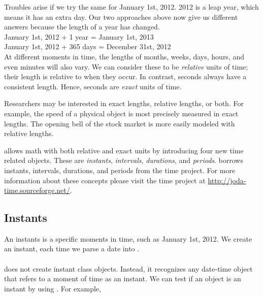 \documentclass[article]{jss}
\begin{document}
Troubles arise if we try the same for January 1st, 2012. 2012 is a leap year, which means it has an extra day. Our two approaches above now give us different answers because the length of a year has changed.\\ 

January 1st, 2012 + 1 year = January 1st, 2013\\
January 1st, 2012 + 365 days = December 31st,  2012\\

At different moments in time, the lengths of months, weeks, days, hours, and even minutes will also vary. We can consider these to be \emph{relative} units of time; their length is relative to when they occur. In contrast, seconds always have a consistent length. Hence, seconds are \emph{exact} units of time.

Researchers may be interested in exact lengths, relative lengths, or both. For example, the speed of a physical object is most precisely measured in exact lengths. The opening bell of the stock market is more easily modeled with relative lengths.

 allows math with both relative and exact units by introducing four new time related objects. These are \emph{instants}, \emph{intervals}, \emph{durations}, and \emph{periods}.   borrows instants, intervals, durations, and periods from the  time project. For more information about these concepts please visit the  time project at  \url{http://joda-time.sourceforge.net/}. 

\subsection{Instants}
\label{sec:instants}

An instants is a specific moments in time, such as January 1st, 2012. We create an instant, each time we parse a date into . \\

\\

 does not create instant class objects. Instead, it recognizes any date-time object that refers to a moment of time as an instant. We can test if an object is an instant by using . For example,\\

\\
\\
\end{document}

